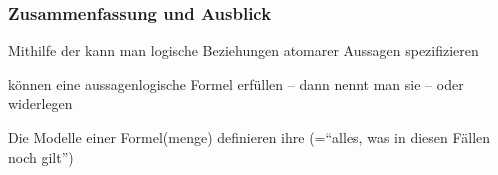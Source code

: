 \documentclass[aspectratio=1610,onlymath]{beamer}
\begin{document}
\begin{frame}\frametitle{Zusammenfassung und Ausblick}

Mithilfe der  kann man logische Beziehungen atomarer Aussagen spezifizieren
\bigskip

 können eine aussagenlogische Formel erfüllen -- dann nennt man sie  -- oder widerlegen
\bigskip

Die Modelle einer Formel(menge) definieren ihre 
(="`alles, was in diesen Fällen noch gilt"')\bigskip


\end{frame}
\end{document}
